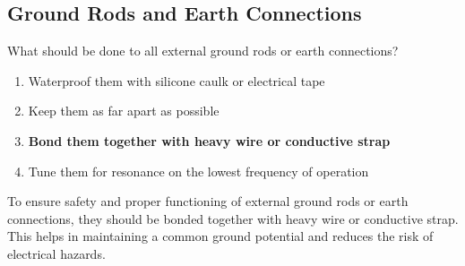 \subsection{Ground Rods and Earth Connections}
\label{T0A09}

\begin{tcolorbox}[colback=gray!10!white,colframe=black!75!black,title=T0A09]
What should be done to all external ground rods or earth connections?
\begin{enumerate}[noitemsep]
    \item Waterproof them with silicone caulk or electrical tape
    \item Keep them as far apart as possible
    \item \textbf{Bond them together with heavy wire or conductive strap}
    \item Tune them for resonance on the lowest frequency of operation
\end{enumerate}
\end{tcolorbox}

To ensure safety and proper functioning of external ground rods or earth connections, they should be bonded together with heavy wire or conductive strap. This helps in maintaining a common ground potential and reduces the risk of electrical hazards.